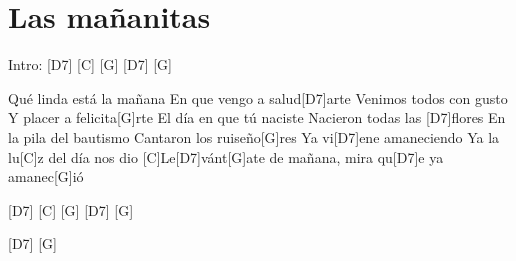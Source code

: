 \section{Las mañanitas}


\vspace{1cm}

\begin{guitar}
	
	Intro: \hspace{0.5cm} [D7] \hspace{0.5cm}[C] \hspace{0.5cm} [G] \hspace{0.5cm}[D7] \hspace{0.5cm} [G]
	
	\newline
	[G]Qué linda está la mañana
	En que vengo a salud[D7]arte
	Venimos todos con gusto
	Y placer a felicita[G]rte
	El día en que tú naciste
	Nacieron todas las [D7]flores
	En la pila del bautismo
	Cantaron los ruiseño[G]res
	Ya vi[D7]ene amaneciendo
	Ya la lu[C]z del día nos dio
	[C]Le[D7]vánt[G]ate de mañana, mira qu[D7]e ya amanec[G]ió
		
	\vspace{0.1cm}
	
	[D7] \hspace{0.5cm}[C] \hspace{0.5cm} [G] \hspace{0.5cm}[D7] \hspace{0.5cm} [G]
	
	[D7] \hspace{0.1cm}[G]
	
\end{guitar}
